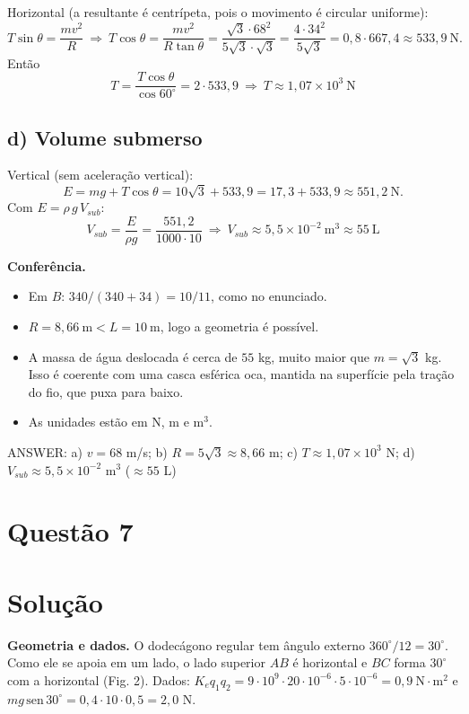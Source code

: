 \documentclass{article}%
\begin{document}
Horizontal (a resultante é centrípeta, pois o movimento é circular uniforme):
\[
T\sin\theta=\dfrac{mv^2}{R}\ \Rightarrow\ T\cos\theta=\dfrac{mv^2}{R\tan\theta}=\dfrac{\sqrt3\cdot 68^2}{5\sqrt3\cdot\sqrt3}=\dfrac{4\cdot 34^2}{5\sqrt3}=0{,}8\cdot 667{,}4\approx 533{,}9\ \text{N}.
\]
Então
\[
T=\dfrac{T\cos\theta}{\cos 60^\circ}=2\cdot 533{,}9\ \Rightarrow\ \boxed{T\approx 1{,}07\times10^{3}\ \text{N}}
\]

\subsection*{d) Volume submerso}
Vertical (sem aceleração vertical):
\[
E=mg+T\cos\theta=10\sqrt3+533{,}9=17{,}3+533{,}9\approx 551{,}2\ \text{N}.
\]
Com $E=\rho\,g\,V_{sub}$:
\[
V_{sub}=\dfrac{E}{\rho g}=\dfrac{551{,}2}{1000\cdot 10}\ \Rightarrow\ \boxed{V_{sub}\approx 5{,}5\times10^{-2}\ \text{m}^3\approx 55\ \text{L}}
\]

\textbf{Conferência.}
\begin{itemize}
\item Em $B$: $340/(340+34)=10/11$, como no enunciado.
\item $R=8{,}66\ \text{m}<L=10\ \text{m}$, logo a geometria é possível.
\item A massa de água deslocada é cerca de $55$ kg, muito maior que $m=\sqrt3$ kg. Isso é coerente com uma casca esférica oca, mantida na superfície pela tração do fio, que puxa para baixo.
\item As unidades estão em N, m e m$^3$.
\end{itemize}

ANSWER: a) $v=68$ m/s; b) $R=5\sqrt3\approx 8{,}66$ m; c) $T\approx 1{,}07\times10^{3}$ N; d) $V_{sub}\approx 5{,}5\times10^{-2}$ m$^3$ ($\approx 55$ L)%
\newpage%
\section*{Questão 7}

\section*{Solução}

\textbf{Geometria e dados.} O dodecágono regular tem ângulo externo $360^\circ/12=30^\circ$. Como ele se apoia em um lado, o lado superior $AB$ é horizontal e $BC$ forma $30^\circ$ com a horizontal (Fig. 2). Dados: $K_eq_1q_2=9\cdot10^{9}\cdot20\cdot10^{-6}\cdot5\cdot10^{-6}=0{,}9\ \text{N}\cdot\text{m}^2$ e $mg\,\mathrm{sen}\,30^\circ=0{,}4\cdot10\cdot0{,}5=2{,}0$ N.
\end{document}
